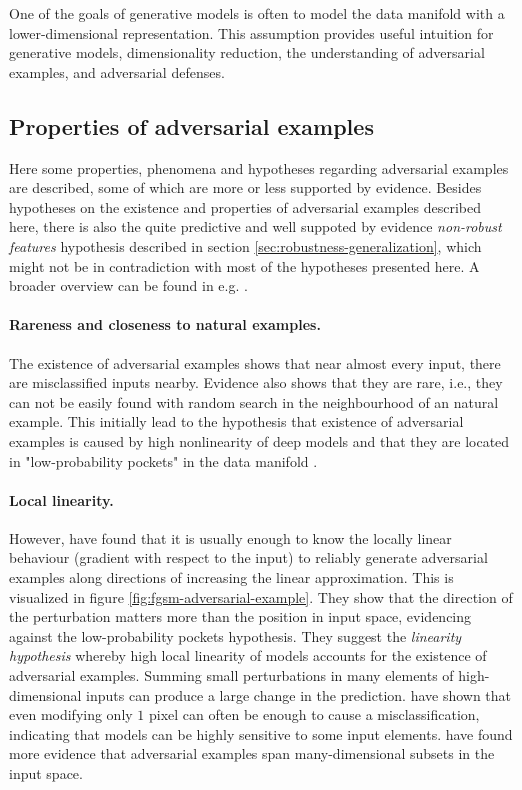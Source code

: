 \documentclass[twocolumn]{article}
\begin{document}
One of the goals of generative models is often to model the data manifold with a lower-dimensional representation. This assumption provides useful intuition for generative models, dimensionality reduction, the understanding of adversarial examples, and adversarial defenses.


\subsection{Properties of adversarial examples}

Here some properties, phenomena and hypotheses regarding adversarial examples are described, some of which are more or less supported by evidence. Besides hypotheses on the existence and properties of adversarial examples described here, there is also the quite predictive and well suppoted by evidence \textit{non-robust features} hypothesis described in section \ref{sec:robustness-generalization}, which might not be in contradiction with most of the hypotheses presented here. A broader overview can be found in e.g. \citet{Serban:2018:AECCP}.

\paragraph{Rareness and closeness to natural examples.} The existence of adversarial examples shows that near almost every input, there are misclassified inputs nearby. Evidence also shows that they are rare, i.e., they can not be easily found with random search in the neighbourhood of an natural example. This initially lead to the hypothesis that existence of adversarial examples is caused by high nonlinearity of deep models and that they are located in "low-probability pockets" in the data manifold \citep{Szegedy:2013:IPNN}. 

\paragraph{Local linearity.} However, \citet{Goodfellow:2014:EHAE} have found that it is usually enough to know the locally linear behaviour (gradient with respect to the input) to reliably generate adversarial examples along directions of increasing the linear approximation. This is visualized in figure \ref{fig:fgsm-adversarial-example}. They show that the direction of the perturbation matters more than the position in input space, evidencing against the low-probability pockets hypothesis. They suggest the \textit{linearity hypothesis} whereby high local linearity of models accounts for the existence of adversarial examples. Summing small perturbations in many elements of high-dimensional inputs can produce a large change in the prediction. \citet{Su:2017:OPAFDNN} have shown that even modifying only $1$ pixel can often be enough to cause a misclassification, indicating that models can be highly sensitive to some input elements. \citet{Tabacof:2016:ESAI} have found more evidence that adversarial examples span many-dimensional subsets in the input space.
\end{document}
